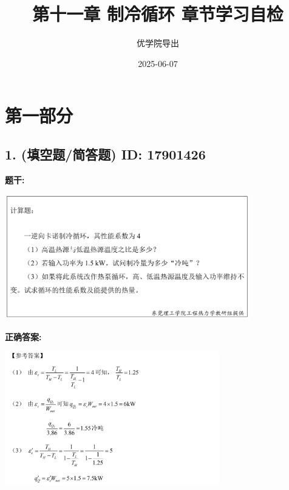 \documentclass[12pt]{article}
\title{第十一章 制冷循环 章节学习自检}
\author{优学院导出}
\date{2025-06-07}
\begin{document}
\maketitle

\section*{第一部分}
\hrulefill

\subsection*{1. (填空题/简答题) \small ID: 17901426}

\textbf{题干:}


\begin{center}\includegraphics[width=0.8\textwidth, height=0.25\textheight, keepaspectratio]{question_1_17901426/title_img_1.png}\end{center}

\textbf{正确答案:}

\begin{center}\includegraphics[width=0.7\textwidth, height=0.2\textheight, keepaspectratio]{question_1_17901426/correct_answer_1_img_1.png}\end{center}

\vspace{0.5em}\hrulefill\vspace{1em}
\end{document}
